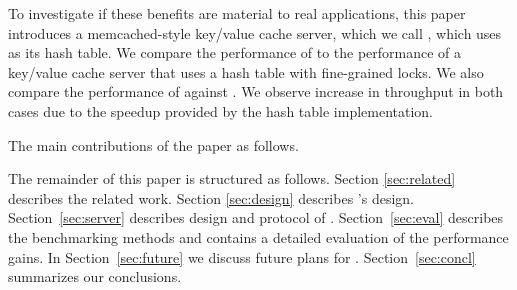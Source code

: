 To investigate if these benefits are material to real applications, this paper introduces a memcached-style key/value cache server, which we call \cpserver{}, which uses \cphash{} as its hash table.  We compare the performance of \cpserver{} to the performance of a key/value cache server that uses a hash table with fine-grained locks. We also compare the performance of \cpserver{} against \memcached{}.  We observe increase in throughput in both cases due to the speedup provided by the \cphash{} hash table implementation.  

The main contributions of the paper as follows. 

The remainder of this paper is structured as follows. Section \ref{sec:related} describes the related work. Section \ref{sec:design} describes \cphash{}'s design. Section~\ref{sec:server} describes design and protocol of \cpserver{}.  Section~\ref{sec:eval} describes the benchmarking methods and contains a detailed evaluation of the performance gains. In Section~\ref{sec:future} we discuss future plans for \cphash{}.  Section~\ref{sec:concl} summarizes our conclusions.

